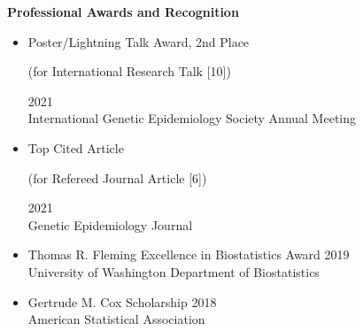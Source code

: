 \documentclass[margin]{res}
\begin{document}
\begin{resume}
\textbf{Professional Awards and Recognition}
\begin{itemize}
\item Poster/Lightning Talk Award, 2nd Place  \begin{footnotesize}(for International Research Talk [10])\end{footnotesize} \hfill 2021 \\
International Genetic Epidemiology Society Annual Meeting
\item Top Cited Article \begin{footnotesize}(for Refereed Journal Article [6])\end{footnotesize}  \hfill 2021 \\
Genetic Epidemiology Journal
\item Thomas R. Fleming Excellence in Biostatistics Award \hfill 2019 \\   
University of Washington Department of Biostatistics
\item Gertrude M. Cox Scholarship \hfill 2018 \\ American Statistical Association

\end{itemize}
\end{resume}
\end{document}
